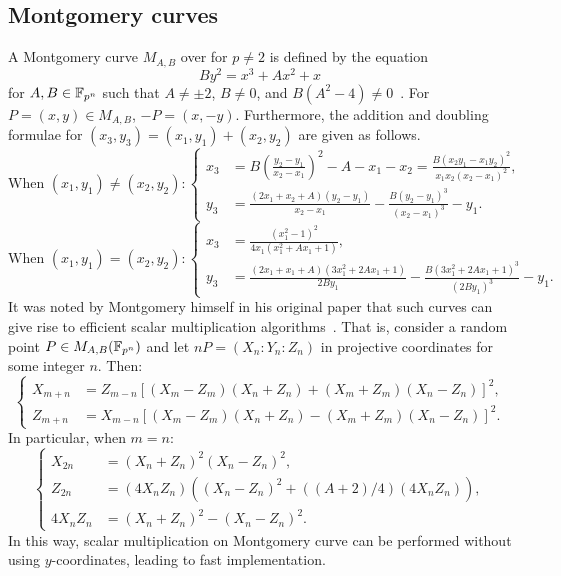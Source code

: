 %
%

\subsection{Montgomery curves}
\label{sec:montgomery-symmetry}
%
A Montgomery curve $M_{A,B}$ over  for $p\neq 2$ is defined by
the equation \begin{equation}
  By^2=x^3+Ax^2+x \label{eq:montgomery-curve} \end{equation} for
$A,B\in\mathbb F_{p^n}$ such that $A\neq\pm 2$, $B\neq 0$, and
$B(A^2-4)\neq 0$~\cite{1987-montgomery}.
%
For $P=(x,y)\in M_{A,B}$, $-P=(x,-y)$.
%
Furthermore, the addition and doubling formulae for
$(x_3,y_3)=(x_1,y_1)+(x_2,y_2)$ are given as follows.
%
\[ \text{When }(x_1,y_1)\neq(x_2,y_2):\left\{\begin{aligned}
      x_3 & = B\left(\frac{y_2 - y_1} {x_2 - x_1}\right)^2 - A - x_1 - x_2 = \frac{B(x_2y_1 - x_1y_2)^2} {x_1x_2(x_2 - x_1)^2}, \\
      y_3 & = \frac{(2x_1 + x_2 + A)(y_2 - y_1)} {x_2 - x_1} -
      \frac{B(y_2 - y_1)^3} {(x_2 - x_1)^3} - y_1.
    \end{aligned}\right. \] \[ \text{When }(x_1,y_1)=(x_2,y_2):\left\{\begin{aligned}
      x_3 & = \frac{(x_1^2 - 1)^2} {4x_1(x_1^2 + Ax_1 + 1)},  \\
      y_3 & = \frac{(2x_1 + x_1 + A)(3x_1^2 + 2Ax_1 + 1)} {2By_1} -
      \frac{B(3x_1^2 + 2Ax_1 + 1)^3} {(2By_1)^3} - y_1.
  \end{aligned}\right. \]
%
It was noted by Montgomery himself in his original paper that such
curves can give rise to efficient scalar multiplication
algorithms~\cite{1987-montgomery}.
%
That is, consider a random point $P\in M_{A,B}(\mathbb F_{p^n})$ and let
$nP=(X_n:Y_n:Z_n)$ in projective coordinates for some integer $n$.
%
Then:
%
\[ \left\{\begin{aligned}
      X_{m+n} & = Z_{m-n}[(X_m - Z_m)(X_n + Z_n) + (X_m + Z_m)(X_n - Z_n)]^2, \\
      Z_{m+n} & = X_{m-n}[(X_m - Z_m)(X_n + Z_n) - (X_m + Z_m)(X_n -
      Z_n)]^2.
    \end{aligned}\right. \]
%
In particular, when $m=n$:
\[ \left\{\begin{aligned}
      X_{2n} & = (X_n + Z_n)^2(X_n - Z_n)^2, \\
      Z_{2n} & = (4X_nZ_n)\left((X_n - Z_n)^2 + ((A+2)/4)(4X_nZ_n)\right), \\
      4X_nZ_n & = ( X_n + Z_n)^2 - (X_n - Z_n)^2.
    \end{aligned}\right. \]
%
In this way, scalar multiplication on Montgomery curve can be
performed without using $y$-coordinates, leading to fast
implementation.

